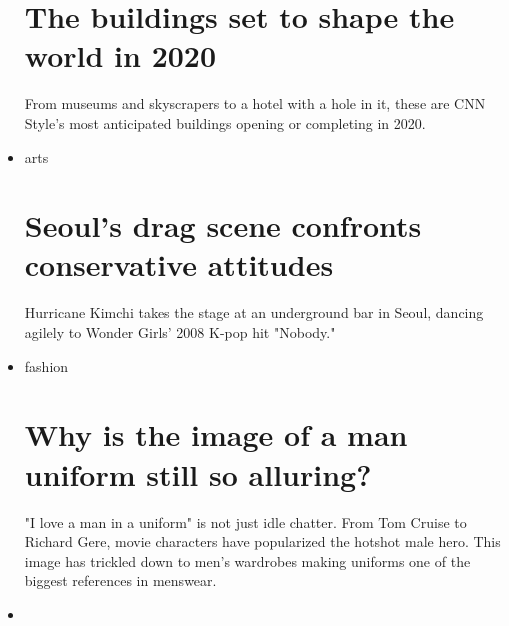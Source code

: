 \begin{itemize}
  \hypertarget{the-buildings-set-to-shape-the-world-in-2020}{%
  \section{The buildings set to shape the world in
  2020}\label{the-buildings-set-to-shape-the-world-in-2020}}

  \href{/style/article/anticipated-buildings-2020/index.html}{}

  From museums and skyscrapers to a hotel with a hole in it, these are
  CNN Style's most anticipated buildings opening or completing in 2020.
\item
  \href{/style/arts}{}

  arts

  \href{/style/article/seoul-drag-queens/index.html}{}

  \hypertarget{seouls-drag-scene-confronts-conservative-attitudes}{%
  \section{Seoul's drag scene confronts conservative
  attitudes}\label{seouls-drag-scene-confronts-conservative-attitudes}}

  \href{/style/article/seoul-drag-queens/index.html}{}

  Hurricane Kimchi takes the stage at an underground bar in Seoul,
  dancing agilely to Wonder Girls' 2008 K-pop hit "Nobody."
\item
  \href{/style/fashion}{}

  fashion

  \href{/style/article/menswear-uniforms-fashion/index.html}{}

  \hypertarget{why-is-the-image-of-a-man-uniform-still-so-alluring}{%
  \section{Why is the image of a man uniform still so
  alluring?}\label{why-is-the-image-of-a-man-uniform-still-so-alluring}}

  \href{/style/article/menswear-uniforms-fashion/index.html}{}

  "I love a man in a uniform" is not just idle chatter. From Tom Cruise
  to Richard Gere, movie characters have popularized the hotshot male
  hero. This image has trickled down to men's wardrobes making uniforms
  one of the biggest references in menswear.
\item
  \href{/style/fashion}{}


\end{itemize}

